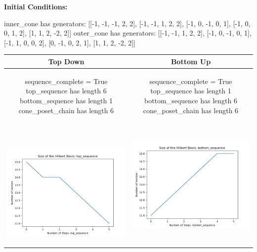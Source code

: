\documentclass[10pt]{article}
\begin{document}
\textbf{Initial Conditions:}
\begin{SAGE}
inner_cone has generators: 
[[-1, -1, -1, 2, 2], [-1, -1, 1, 2, 2], [-1, 0, -1, 0, 1], [-1, 0, 0, 1, 2], [1, 1, 2, -2, 2]]
outer_cone has generators: 
[[-1, -1, 1, 2, 2], [-1, 0, -1, 0, 1], [-1, 1, 0, 0, 2], [0, -1, 0, 2, 1], [1, 1, 2, -2, 2]]

\end{SAGE}
\begin{tabular}{c|c}
\textbf{Top Down} & \textbf{Bottom Up} \\ \hline  
\begin{SAGE}
	sequence_complete = True
	top_sequence has length 6
	bottom_sequence has length 1
	cone_poset_chain has length 6
\end{SAGE} 
&
\begin{SAGE}
	sequence_complete = True
	top_sequence has length 1
	bottom_sequence has length 6
	cone_poset_chain has length 6
\end{SAGE} 
\\ \hline
\
\begin{minipage}{.45\textwidth}
\includegraphics[width=\textwidth]{"DATA/5d/5 generators 2 bound G/top_sequence SIZE"}
\end{minipage} &
\begin{minipage}{.45\textwidth}
\includegraphics[width=\textwidth]{"DATA/5d/5 generators 2 bound G bottomup/bottom_sequence SIZE"}

\end{minipage}
\end{tabular}
\end{document}
